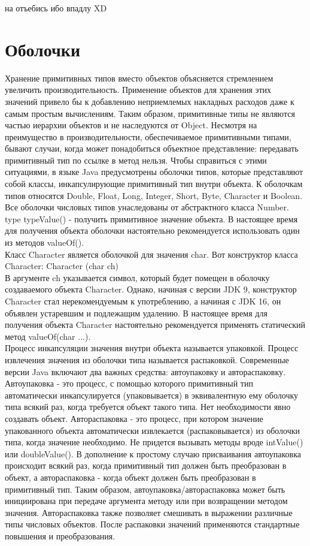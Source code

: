 

 на отъебись ибо впадлу XD
\section{Оболочки}
\noindent Хранение примитивных типов вместо объектов объясняется стремлением увеличить производительность. Применение объектов для хранения этих значений привело бы к добавлению неприемлемых накладных расходов даже к самым простым вычислениям. Таким образом, примитивные типы не являются частью иерархии объектов и не наследуются от Object. Несмотря на преимущество в производительности, обеспечиваемое примитивными типами, бывают случаи, когда может понадобиться объектное представление: передавать примитивный тип по ссылке в метод нельзя. Чтобы справиться с этими  ситуациями, в языке Java предусмотрены оболочки типов, которые представляют собой классы, инкапсулирующие примитивный тип внутри объекта. К оболочкам типов относятся Double, Float, Long, Integer, Short, Byte, Character и Boolean. Все оболочки числовых типов унаследованы от абстрактного класса Number. type typeValue() - получить примитивное значение объекта. В настоящее время для получения объекта оболочки настоятельно рекомендуется использовать один из методов valueOf().  \\
Класс Character является оболочкой для значения char. Вот конструктор
класса Character: Character (char ch) \\
В аргументе ch указывается символ, который будет помещен в оболочку создаваемого объекта Character. Однако, начиная с версии JDK 9, конструктор Character стал нерекомендуемым к употреблению, а начиная с JDK 16, он объявлен устаревшим и подлежащим удалению. В настоящее время для получения объекта Character настоятельно рекомендуется применять статический метод valueOf(char ...).  \\
Процесс инкапсуляции значения внутри объекта называется упаковкой. Процесс извлечения значения из оболочки типа называется распаковкой. Современные версии Java включают два важных средства: автоупаковку и
автораспаковку. Автоупаковка - это процесс, с помощью которого примитивный тип автоматически инкапсулируется (упаковывается) в эквивалентную ему оболочку типа всякий раз, когда требуется объект такого типа. Нет необходимости явно создавать объект. Автораспаковка - это процесс, при котором значение упакованного объекта автоматически извлекается (распаковывается) из оболочки типа, когда значение необходимо. Не придется вызывать методы вроде intValue() или doubleValue(). В дополнение к простому случаю присваивания автоупаковка происходит всякий раз, когда примитивный тип должен быть преобразован в объект, а автораспаковка - когда объект должен быть преобразован в примитивный тип. Таким образом, автоупаковка/автораспаковка может быть инициирована при передаче аргумента методу или при возвращении методом значения. Автораспаковка также позволяет смешивать в выражении различные типы числовых объектов. После распаковки значений применяются стандартные повышения и преобразования. \\
